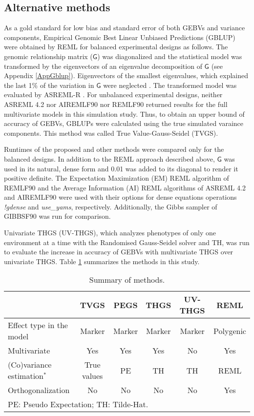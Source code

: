 \documentclass{bmcart}
\newcommand{\mat}[1]{\boldsymbol{\mathsf{#1}}}
\begin{document}
\subsection{Alternative methods}

As a gold standard for low bias and standard error of both GEBVs and variance components, Empirical Genomic Best Linear Unbiased Predictions (GBLUP) \cite{GBLUP} were obtained by REML \cite{AIREML} for balanced experimental designs as follows. The genomic relationship matrix ($\mat{G}$) was diagonalized and the statistical model was transformed by the eigenvectors of an eigenvalue decomposition of $\mat{G}$ \cite{TS1990} (see Appendix \ref{AppGblup}). Eigenvectors of the smallest eigenvalues, which explained the last 1\% of the variation in $\mat{G}$ were neglected \cite{Pocrnic2016}. The transformed model was evaluated by ASREML-R \cite{asreml}. For unbalanced experimental designs, neither ASREML 4.2 nor AIREMLF90 nor REMLF90 returned results for the full multivariate models in this simulation study. Thus, to obtain an upper bound of accuracy of GEBVs, GBLUPs were calculated using the true simulated varaince components. This method was called True Value-Gauss-Seidel (TVGS).

Runtimes of the proposed and other methods were  compared only for the balanced designs. In addition to the REML approach described above, $\mat{G}$ was used in its natural, dense form and 0.01 was added to its diagonal to render it positive definite. The Expectation Maximization (EM) REML algorithm of REMLF90 \cite{BLUPF90} and the Average Information (AI) REML algorithms of ASREML 4.2 \cite{AIREML,asreml} and AIREMLF90 \cite{YAMS} were used with their options for dense equations operations \textit{!gdense}  and \textit{use\_yams}, respectively. Additionally, the Gibbs sampler of GIBBSF90 was run for comparison.

Univariate THGS (UV-THGS), which analyzes phenotypes of only one environment at a time with the Randomised Gauss-Seidel solver and TH, was run to evaluate the increase in accuracy of GEBVs with multivariate THGS over univariate THGS. Table \ref{METHODS} summarizes the methods in this study.
\begin{table}[ht]
\centering
\renewcommand*{\arraystretch}{1.2}
\caption{Summary of methods.}\smallskip
\begin{tabular}{l c c c c c}
\hline
  & TVGS & PEGS & THGS & UV-THGS & REML  \\
\hline
Effect type in the model & Marker & Marker & Marker & Marker & Polygenic \\
Multivariate & Yes & Yes & Yes & No & Yes  \\
(Co)variance estimation$^{*}$ & True values & PE & TH & TH & REML  \\
Orthogonalization & No & No & No & No & Yes  \\
\hline
\multicolumn{5}{l}{\small *PE: Pseudo Expectation; TH: Tilde-Hat.}
\end{tabular}
\label{METHODS}
\end{table}
\end{document}
